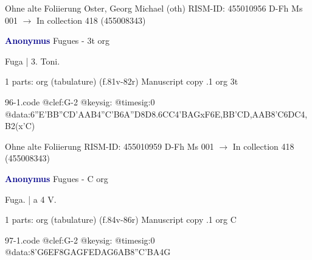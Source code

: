 \documentclass[twocolumn]{book}
\begin{document}
\newline Ohne alte Foliierung
\newline Oster, Georg Michael  (oth)
\newline RISM-ID: 455010956
\newline D-Fh  Ms 001
\newline $\rightarrow$ In collection 418 (455008343)
      
\newline \par \vspace{7pt} \textcolor{darkblue}{\textbf{Anonymus  }}
\newline Fugues - 3t
\newline org
\newline \begin{itshape}[f.81v, at left:] Fuga | 3. Toni.\end{itshape} 
\newline \textcolor{darkblue}{}  1 parts: org (tabulature)  (f.81v-82r)
\newline Manuscript copy
.1  org  3t  
\begin{filecontents*}{96-1.code}
@clef:G-2
@keysig:
@timesig:0
@data:{6''E'BB''C}{D'AAB}4''C'B{6A''D}8D{8.6CC}4'BAGxF{6E,BB'C}{D,AAB}8'C{6DC}4,B2(x'C)
\end{filecontents*}
\newline
%

\newline Ohne alte Foliierung
\newline RISM-ID: 455010959
\newline D-Fh  Ms 001
\newline $\rightarrow$ In collection 418 (455008343)
      
\newline \par \vspace{7pt} \textcolor{darkblue}{\textbf{Anonymus  }}
\newline Fugues - C
\newline org
\newline \begin{itshape}[f.84v, at left:] Fuga. | a 4 V.\end{itshape} 
\newline \textcolor{darkblue}{}  1 parts: org (tabulature)  (f.84v-86r)
\newline Manuscript copy
.1  org  C  
\begin{filecontents*}{97-1.code}
@clef:G-2
@keysig:
@timesig:0
@data:{8'G6EF8GA}{GFED}{AG6AB8''C}{'BA}4G
\end{filecontents*}
\newline
%
\end{document}
